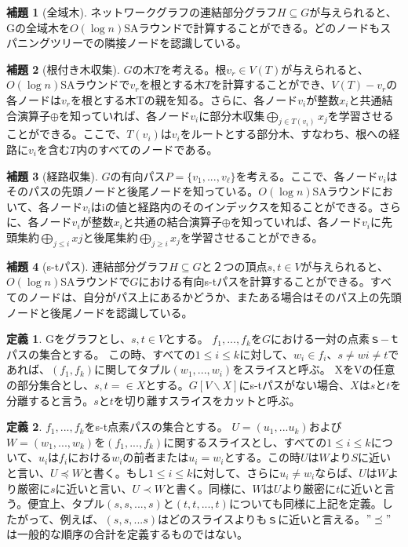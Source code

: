 \documentclass{jarticle}
\theoremstyle{definition}
\newtheorem{lemma}{補題}
\newtheorem{definition}{定義}
\begin{document}
\newpage
\begin{lemma}[全域木]
    ネットワークグラフの連結部分グラフ$H\subseteq G$が与えられると、Gの全域木を$O(\log n)$SAラウンドで計算することができる。どのノードもスパニングツリーでの隣接ノードを認識している。
\end{lemma}

\begin{lemma}[根付き木収集]
    $G$の木$T$を考える。根$v_r \in V(T)$が与えられると、$O(\log n)$SAラウンドで$v_r$を根とする木$T$を計算することができ、$V(T)-v_r$の各ノードは$v_r$を根とする木Tの親を知る。さらに、各ノード$v_i$が整数$x_i$と共通結合演算子$\oplus$を知っていれば、各ノード$v_i$に部分木収集$\bigoplus_{j\in T(v_i)}x_j$を学習させることができる。ここで、$T(v_i)$は$v_i$をルートとする部分木、すなわち、根への経路に$v_i$を含む$T$内のすべてのノードである。
\end{lemma}

\begin{lemma}[経路収集]
    $G$の有向パス$P = \{v_1,...,v_\ell\}$を考える。ここで、各ノード$v_i$はそのパスの先頭ノードと後尾ノードを知っている。$O(\log n)$SAラウンドにおいて、各ノード$v_i$はiの値と経路内のそのインデックスを知ることができる。さらに、各ノード$v_i$が整数$x_i$と共通の結合演算子$\oplus$を知っていれば、各ノード$v_i$に先頭集約$\bigoplus_{j\leq i}xj$と後尾集約$\bigoplus_{j\geq i}x_j$を学習させることができる。
\end{lemma}

\begin{lemma}[s-tパス]
    連結部分グラフ$H\subseteq G$と２つの頂点$s,t\in V$が与えられると、$O(\log n)$SAラウンドで$G$における有向s-tパスを計算することができる。すべてのノードは、自分がパス上にあるかどうか、またある場合はそのパス上の先頭ノードと後尾ノードを認識している。
\end{lemma}
\newpage
\begin{definition}
    Gをグラフとし、$s,t\in V$とする。 ${f_1,...,f_k}$を$G$における一対の点素ｓ−ｔパスの集合とする。
    この時、すべての$1\leq i\leq k$に対して、$w_i \in f_i$、$s \neq wi \neq t$であれば、$(f_1,f_k)$に関してタプル$(w_1,...,w_i)$をスライスと呼ぶ。
    XをVの任意の部分集合とし、$s,t = \in X$とする。$G[V\backslash X]$にs-tパスがない場合、$X$は$s$と$t$を分離すると言う。$s$と$t$を切り離すスライスをカットと呼ぶ。
\end{definition}

\begin{definition}
    ${f_1,...,f_k}$をs-t点素パスの集合とする。
    $U=(u_1,...u_k)$および$W=(w_1,...,w_k)$を$(f_1,...,f_k)$に関するスライスとし、すべての$1\leq i\leq k$について、$u_i$は$f_i$における$w_i$の前者または$u_i=w_i$とする。この時$U$は$W$より$S$に近いと言い、$U\preceq W$と書く。もし$1 \leq i \leq k$に対して、さらに$u_i \neq w_i$ならば、$U$は$W$より厳密に$s$に近いと言い、$U \prec W$と書く。同様に、$W$は$U$より厳密に$t$に近いと言う。便宜上、タプル$(s,s,...,s)$と$(t,t,...,t)$についても同様に上記を定義。したがって、例えば、$(s,s,...s)$はどのスライスよりもｓに近いと言える。$"\preceq"$は一般的な順序の合計を定義するものではない。
\end{definition}
\end{document}
